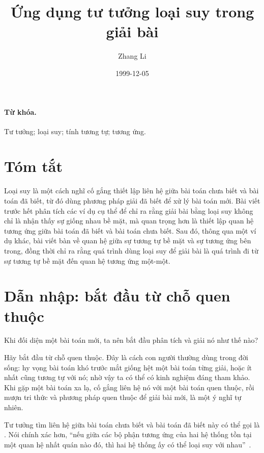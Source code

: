 \documentclass[11pt]{article}
\title{Ứng dụng tư tưởng loại suy trong giải bài}
\author{Zhang Li}
\date{1999-12-05}
\begin{document}
\maketitle


\paragraph{Từ khóa.}
Tư tưởng; loại suy; tính tương tự; tương ứng.

\section*{Tóm tắt}

Loại suy là một cách nghĩ cố gắng thiết lập liên hệ giữa bài toán chưa biết và
bài toán đã biết, từ đó dùng phương pháp giải đã biết để xử lý bài toán mới.
Bài viết trước hết phân tích các ví dụ cụ thể để chỉ ra rằng giải bài bằng
loại suy không chỉ là nhận thấy sự giống nhau bề mặt, mà quan trọng hơn là
thiết lập quan hệ tương ứng giữa bài toán đã biết và bài toán chưa biết. Sau
đó, thông qua một ví dụ khác, bài viết bàn về quan hệ giữa sự tương tự bề mặt
và sự tương ứng bên trong, đồng thời chỉ ra rằng quá trình dùng loại suy để
giải bài là quá trình đi từ sự tương tự bề mặt đến quan hệ tương ứng một-một.

\section*{Dẫn nhập: bắt đầu từ chỗ quen thuộc}

Khi đối diện một bài toán mới, ta nên bắt đầu phân tích và giải nó như thế
nào?

Hãy bắt đầu từ chỗ quen thuộc. Đây là cách con người thường dùng trong đời
sống: hy vọng bài toán khó trước mắt giống hệt một bài toán từng giải, hoặc
ít nhất cũng tương tự với nó; nhờ vậy ta có thể có kinh nghiệm đáng tham
khảo. Khi gặp một bài toán xa lạ, cố gắng liên hệ nó với một bài toán quen
thuộc, rồi mượn tri thức và phương pháp quen thuộc để giải bài mới, là một ý
nghĩ tự nhiên.

Tư tưởng tìm liên hệ giữa bài toán chưa biết và bài toán đã biết này có thể
gọi là . Nói chính xác hơn, ``nếu giữa các bộ phận tương ứng
của hai hệ thống tồn tại một quan hệ nhất quán nào đó, thì hai hệ thống ấy có
thể loại suy với nhau''~\cite{polya}.
\end{document}
